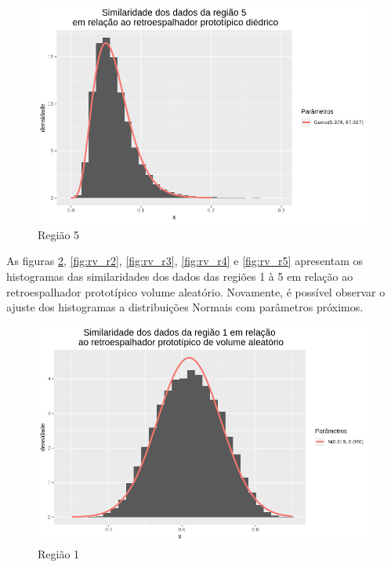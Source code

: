 \documentclass[12pt]{article}
\begin{document}
\begin{figure}[!h]
    \centering
    \includegraphics[width = 0.95\linewidth]{../../Images/Report_18_12_17/di_region5.png}
    \caption{Região 5}
    \label{fig:di_r5}
\end{figure}

As figuras \ref{fig:rv_r1}, \ref{fig:rv_r2}, \ref{fig:rv_r3}, \ref{fig:rv_r4} e \ref{fig:rv_r5} apresentam os histogramas das similaridades dos dados das regiões 1 à 5 em relação ao retroespalhador prototípico volume aleatório. Novamente, é possível observar o ajuste dos histogramas a distribuições Normais com parâmetros próximos.

\begin{figure}[!h]
    \centering
    \includegraphics[width = 0.95\linewidth]{../../Images/Report_18_12_17/rv_region1.png}
    \caption{Região 1}
    \label{fig:rv_r1}
\end{figure}
\end{document}
